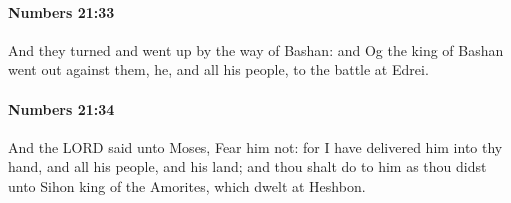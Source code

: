 		\paragraph{Numbers 21:33} %
			\label{NUMBERS-21-33}

			And they turned and went up by the way of Bashan: and Og the king of Bashan went out against them, he, and all his people, to the battle at Edrei.


		\paragraph{Numbers 21:34} %
			\label{NUMBERS-21-34}

			And the LORD said unto Moses, Fear him not: for I have delivered him into thy hand, and all his people, and his land; and thou shalt do to him as thou didst unto Sihon king of the Amorites, which dwelt at Heshbon.


